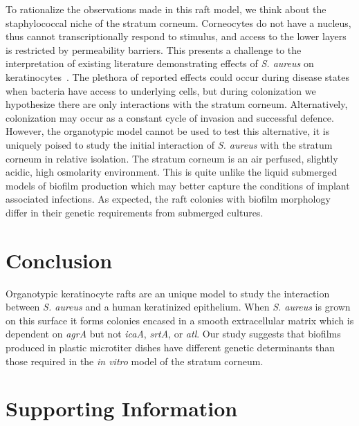 \documentclass[10pt,letterpaper]{article}
\newcommand{\beginsupplement}{%
        \setcounter{table}{0}
        \renewcommand{\thetable}{S\arabic{table}}%
        \setcounter{figure}{0}
        \renewcommand{\thefigure}{S\arabic{figure}}%
     }
\begin{document}
To rationalize the observations made in this raft model, we think about the staphylococcal niche of the stratum corneum.
Corneocytes do not have a nucleus, thus cannot transcriptionally respond to stimulus, and access to the lower layers is restricted by permeability barriers.
This presents a challenge to the interpretation of existing literature demonstrating effects of \textit{S. aureus} on keratinocytes~\cite{mempel_invasion_2002, menzies_signal_2006, secor_staphylococcus_2011, soong_methicillin-resistant_2015, haugwitz_pore-forming_2006}.
The plethora of reported effects could occur during disease states when bacteria have access to underlying cells, but during colonization we hypothesize there are only interactions with the stratum corneum.
Alternatively, colonization may occur as a constant cycle of invasion and successful defence.
However, the organotypic model cannot be used to test this alternative, it is uniquely poised to study the initial interaction of \textit{S. aureus} with the stratum corneum in relative isolation.
The stratum corneum is an air perfused, slightly acidic, high osmolarity environment.
This is quite unlike the liquid submerged models of biofilm production which may better capture the conditions of implant associated infections.
As expected, the raft colonies with biofilm morphology differ in their genetic requirements from submerged cultures.

\section*{Conclusion}
Organotypic keratinocyte rafts are an unique model to study the interaction between \textit{S. aureus} and a human keratinized epithelium.
When \textit{S. aureus} is grown on this surface it forms colonies encased in a smooth extracellular matrix which is dependent on \textit{agrA} but not \textit{icaA}, \textit{srtA}, 
or \textit{atl}.
Our study suggests that biofilms produced in plastic microtiter dishes have different genetic determinants than those required in the \textit{in vitro} model of the stratum corneum.

\beginsupplement

\section*{Supporting Information}
\end{document}
